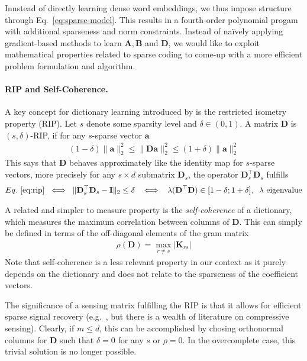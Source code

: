 \documentclass{article}
\newcommand{\valpha}{{\boldsymbol a}}
\newcommand{\mK}{{\mathbf K}}
\newcommand{\mD}{{\mathbf D}}
\newcommand{\mA}{{\mathbf A}}
\newcommand{\mB}{{\mathbf B}}
\begin{document}
Innstead of directly learning dense word embeddings, we thus impose structure through Eq.~\eqref{eq:sparse-model}. This results in a fourth-order polynomial progam with additional sparseness and norm constraints. Instead of na\"ively applying  gradient-based methods to learn $\mA, \mB$ and $\mD$, we would like to exploit mathematical properties related to sparse coding to come-up with a more efficient problem formulation and algorithm. 


\paragraph{RIP and Self-Coherence.} 

A key concept for dictionary learning introduced by \cite{candes2005decoding} is the restricted isometry property (RIP). Let $s$ denote some sparsity level and $\delta \in (0,1)$. A matrix $\mD$ is $(s,\delta)$-RIP, if for any $s$-sparse vector $\valpha$
\begin{align}
(1-\delta) \| \valpha \|^2_2  \leq \| \mD \valpha\|_2^2 \le (1+\delta) \| \valpha\|_2^2
\label{eq:rip}
\end{align}
This says that $\mD$ behaves approximately like the identity map for $s$-sparse vectors,  more precisely for any  $s\times d$ submatrix $\mD_s$, the operator $\mD_s^\top \mD_s$ fulfills
\begin{align}
Eq.~\eqref{eq:rip} \; \iff \; \| \mD_s^\top \mD_s - \mathbf  I \|_2 \le \delta \;\; \iff \;\; \lambda(\mD^\top \mD) \in [1-\delta; 1+\delta], \;\; \text{$\lambda$ eigenvalue}
\end{align}

A related and simpler to measure property is the \textit{self-coherence} of a dictionary, which measures the maximum correlation between columns of $\mD$. This can simply be defined in terms of the off-diagonal elements of the gram matrix 
\begin{align}
\rho(\mD) = \max_{r \neq s} | \mK_{rs}|
\end{align}
Note that self-coherence is a less relevant property in our context as it purely depends on the dictionary and does not relate to the sparseness of the coefficient vectors. 

The significance of a sensing matrix fulfilling the RIP is that it allows for efficient sparse signal recovery (e.g.~\cite{candes2008restricted}, but there is a wealth of literature on compressive sensing). Clearly, if $m \le d$, this can be accomplished by chosing orthonormal columns for $\mD$ such that $\delta=0$ for any $s$ or $\rho=0$. In the overcomplete case, this trivial solution is no longer possible.
\end{document}
